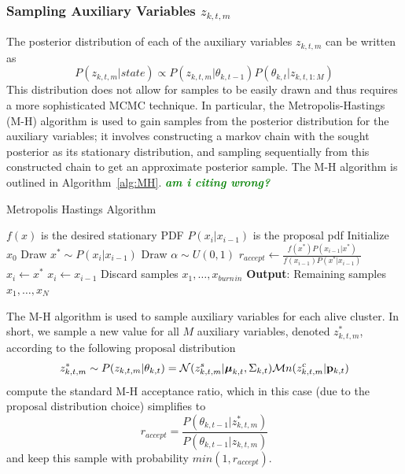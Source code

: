 \documentclass[smallcondensed, final]{svjour3}
\newcommand{\willie}[1]{\textcolor{green}{\textsf{\emph{\textbf{\textcolor{green}{#1}}}}}}
\begin{document}

\subsubsection{Sampling Auxiliary Variables $z_{k,t,m}$}
The posterior distribution of each of the auxiliary variables $z_{k,t,m}$ can be written as
\begin{equation}
P(z_{k,t,m} | state) \propto  P(z_{k,t,m} | \theta_{k,t-1}) P(\theta_{k,t} | z_{k,t,1:M})
\end{equation}
This distribution does not allow for samples to be easily drawn and thus requires a more sophisticated MCMC technique. In particular, the Metropolis-Hastings (M-H) algorithm is used to gain samples from the posterior distribution for the auxiliary variables; it involves constructing a markov chain with the sought posterior as its stationary distribution, and sampling sequentially from this constructed chain to get an approximate posterior sample. The M-H algorithm is outlined in Algorithm~\ref{alg:MH}. \willie{am i citing wrong?}

\begin{algorithm}[h!]
\label{alg:MH}
\caption{Metropolis Hastings Algorithm}
\begin{algorithmic}[1]
\STATE $f(x)$ is the desired stationary PDF
\STATE $P(x_{i} | x_{i-1})$ is the proposal pdf
\STATE Initialize $x_{0}$
\STATE Draw $x^{*} \sim P(x_{i} | x_{i-1})$
\STATE Draw $\alpha \sim U(0,1)$
\STATE $r_{accept} \leftarrow \frac{f(x^{*})P(x_{i-1} | x^{*})} {f(x_{i-1})P(x^{*} | x_{i-1})} $
\STATE $x_{i} \leftarrow x^{*}$
\ELSE
\STATE $x_{i} \leftarrow x_{i-1}$
\ENDIF
\ENDFOR
\STATE Discard samples $x_{1}, \ldots, x_{burn\hspace{1pt}in}$
\STATE \textbf{Output}: Remaining samples $x_{1}, \ldots, x_{N}$
\end{algorithmic}
\end{algorithm}


The M-H algorithm is used to sample auxiliary variables for each alive cluster. In short, we sample a new value for all $M$ auxiliary variables, denoted $z_{k,t,m}^{*}$, according to the following proposal distribution
\begin{equation}
z_{k,t,m}^{*}  \sim  P(z_{k,t,m} | \theta_{k,t}) = \mathcal{N}(z_{k,t,m}^{s} | \boldsymbol{\mu}_{k,t}, \Sigma_{k,t}) \mathcal{M}n(z_{k,t,m}^{c} | \bold{p}_{k,t})
\end{equation}
compute the standard M-H acceptance ratio, which in this case (due to the proposal distribution choice) simplifies to 
\begin{equation}
r_{accept} = \frac{P(\theta_{k,t-1} | z_{k,t,m}^{*})}{P(\theta_{k,t-1} | z_{k,t,m})}
\end{equation}
and keep this sample with probability $min(1, r_{accept})$.
\end{document}
